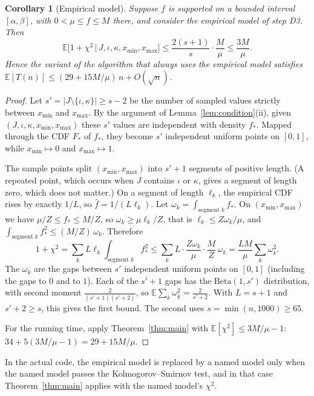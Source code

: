 \documentclass[11pt]{article}
\newtheorem{corollary}[theorem]{Corollary}
\theoremstyle{definition}
\theoremstyle{remark}
\newcommand{\fh}{\widehat{f}}
\newcommand{\E}{\mathbb{E}}
\newcommand{\xmin}{x_{\min}}
\newcommand{\xmax}{x_{\max}}
\begin{document}
\begin{corollary}[Empirical model]\label{cor:empirical}
Suppose $f$ is supported on a bounded interval $[\alpha,\beta]$, with
$0<\mu\le f\le M$ there, and consider the empirical model of step D3. Then
\[
\E\bigl[1+\chi^2\,\big|\,J,\iota,\kappa,\xmin,\xmax\bigr]\le\frac{2(s+1)}{s}\cdot\frac M\mu\le\frac{3M}{\mu}.
\]
Hence the variant of the algorithm that always uses the empirical model
satisfies $\E[T(n)]\le(29+15M/\mu)\,n+O(\sqrt n)$.
\end{corollary}
\begin{proof}
Let $s'=|J\setminus\{\iota,\kappa\}|\ge s-2$ be the number of sampled values
strictly between $\xmin$ and $\xmax$. By the argument of
Lemma~\ref{lem:condition}(ii), given $(J,\iota,\kappa,\xmin,\xmax)$ these
$s'$ values are independent with density $f_\ast$. Mapped through the CDF
$F_\ast$ of $f_\ast$, they become $s'$ independent uniform points on
$[0,1]$, while $\xmin\mapsto0$ and $\xmax\mapsto1$.

The sample points split $(\xmin,\xmax)$ into $s'+1$ segments of positive
length. (A repeated point, which occurs when $J$ contains $\iota$ or
$\kappa$, gives a segment of length zero, which does not matter.) On a
segment of length $\ell_k$, the empirical CDF rises by exactly $1/L$, so
$\fh=1/(L\ell_k)$. Let $\omega_k=\int_{\text{segment }k}f_\ast$. On
$(\xmin,\xmax)$ we have $\mu/Z\le f_\ast\le M/Z$, so
$\omega_k\ge\mu\ell_k/Z$, that is $\ell_k\le Z\omega_k/\mu$, and
$\int_{\text{segment }k}f_\ast^2\le(M/Z)\,\omega_k$. Therefore
\[
1+\chi^2=\sum_kL\ell_k\int_{\text{segment }k}f_\ast^2\le\sum_kL\cdot\frac{Z\omega_k}{\mu}\cdot\frac{M}{Z}\,\omega_k
=\frac{LM}{\mu}\sum_k\omega_k^2 .
\]
The $\omega_k$ are the gaps between $s'$ independent uniform points on
$[0,1]$ (including the gaps to $0$ and to $1$). Each of the $s'+1$ gaps has
the $\mathrm{Beta}(1,s')$ distribution, with second moment
$\frac{2}{(s'+1)(s'+2)}$, so $\E\sum_k\omega_k^2=\frac{2}{s'+2}$. With
$L=s+1$ and $s'+2\ge s$, this gives the first bound. The second uses
$s=\min(n,1000)\ge65$.

For the running time, apply Theorem~\ref{thm:main} with
$\E[\chi^2]\le3M/\mu-1$: $34+5(3M/\mu-1)=29+15M/\mu$.
\end{proof}

In the actual code, the empirical model is replaced by a named model only
when the named model passes the Kolmogorov--Smirnov test, and in that case
Theorem~\ref{thm:main} applies with the named model's $\chi^2$.
\end{document}
